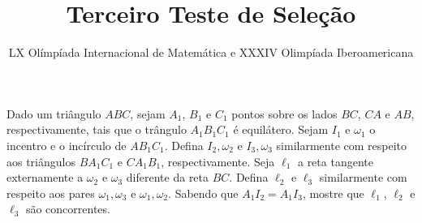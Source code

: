 \documentclass[10pt,a4paper]{article}
\title{Terceiro Teste de Seleção}
\author{\small LX Olímpíada Internacional de Matemática e  XXXIV Olimpíada Iberoamericana}
\begin{document}
\zeustitle

\begin{prob}
	Dado um triângulo $ABC$, sejam $A_1$, $B_1$ e $C_1$ pontos sobre os lados $BC$, $CA$ e $AB$, respectivamente, tais que o trângulo $A_1B_1C_1$ é equilátero.
	Sejam $I_1$ e $\omega_1$ o incentro e o incírculo de $AB_1C_1$.
	Defina $I_2, \omega_2$ e $I_3, \omega_3$ similarmente com respeito aos triângulos $BA_1C_1$ e $CA_1B_1$, respectivamente.
	Seja $\ell_1$ a reta tangente externamente a $\omega_2$ e $\omega_3$ diferente da reta $BC$.
	Defina $\ell_2$ e $\ell_3$ similarmente com respeito aos pares $\omega_1, \omega_3$ e $\omega_1, \omega_2$.
	Sabendo que $A_1I_2 = A_1I_3$, mostre que $\ell_1$, $\ell_2$ e $\ell_3$ são concorrentes.
\end{prob}
\end{document}
